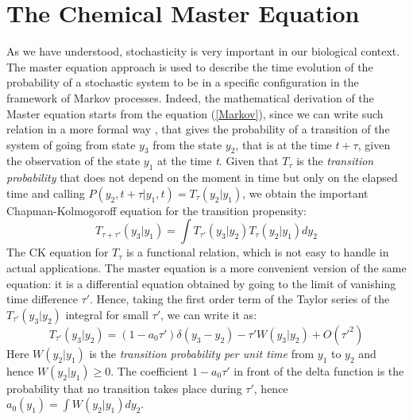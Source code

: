 \documentclass[12pt,a4paper]{report}
\begin{document}
\section{The Chemical Master Equation}
As we have understood, stochasticity is very important in our biological context. The master equation approach is used to describe the time evolution of the probability of a stochastic system to be in a specific configuration in the framework of Markov processes. Indeed, the mathematical derivation of the Master equation starts from the equation (\ref{Markov}), since we can write such relation in a more formal way \cite{PHD}, that gives the probability of a transition of the system of going from state $y_{3}$ from the state $y_{2}$, that is at the time $t+\tau$, given the observation of the state $y_{1}$ at the time \emph{t}. Given that $T_{\tau}$ is the \emph{transition probability} that does not depend on the moment in time but only on the elapsed time and calling $P(y_{2}, t+\tau|y_{1},t) = T_{\tau}(y_{2}|y_{1})$, we obtain the important Chapman-Kolmogoroff equation for the transition propensity:
\begin{equation}
    T_{\tau+\tau'}(y_{3}|y_{1}) = \int T_{\tau'}(y_{3}|y_{2})T_{\tau}(y_{2}|y_{1})dy_{2}
\end{equation}
The CK equation for $T_{\tau}$ is a functional relation, which is not easy to handle in actual applications. The master equation is a more convenient version of the same equation: it is a differential equation obtained by going to the limit of vanishing time difference $\tau'$. Hence, taking the first order term of the Taylor series of the $T_{\tau'}(y_{3}|y_{2})$ integral for small $\tau'$, we can write it as:
\begin{equation}
    T_{\tau'}(y_{3}|y_{2}) = (1-a_{0}\tau')\delta(y_{3}-y_{2}) - \tau'W(y_{3}|y_{2}) + O(\tau'^{2})
\end{equation}
Here $W(y_{2}|y_{1})$ is the \emph{transition probability per unit time} from $y_{1}$ to $y_{2}$ and hence $W(y_{2}|y_{1})\geq0$. The coefficient $1-a_{0}\tau'$ in front of the delta function is the probability that no transition takes place during $\tau'$, hence $a_{0}(y_{1})=\int W(y_{2}|y_{1}) dy_{2}$.
\end{document}
